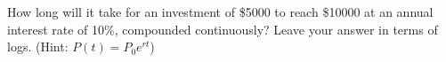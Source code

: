 \begin{questions}
\question[5] %
How long will it take for an investment of \$5000 to reach \$10000 at an annual interest rate of 10\%, compounded continuously? Leave your answer in terms of logs. (Hint: $P(t)=P_0e^{rt}$)%
\vspace{10cm}
\end{questions}